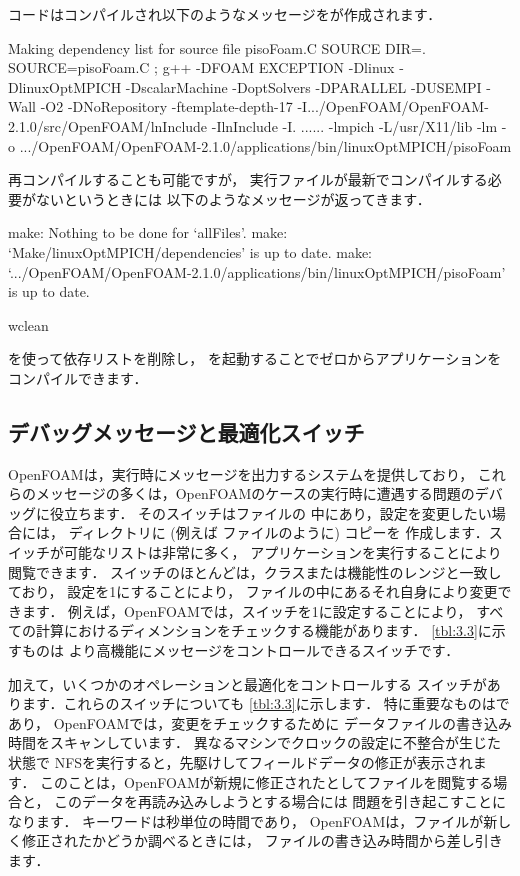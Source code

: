 コードはコンパイルされ以下のようなメッセージをが作成されます．
\begin{OFverbatim}[file]
Making dependency list for source file pisoFoam.C
SOURCE DIR=.
SOURCE=pisoFoam.C ;
g++ -DFOAM EXCEPTION -Dlinux -DlinuxOptMPICH
-DscalarMachine -DoptSolvers -DPARALLEL -DUSEMPI -Wall -O2 -DNoRepository
-ftemplate-depth-17 -I.../OpenFOAM/OpenFOAM-2.1.0/src/OpenFOAM/lnInclude
-IlnInclude
-I.
......
-lmpich -L/usr/X11/lib -lm
-o .../OpenFOAM/OpenFOAM-2.1.0/applications/bin/linuxOptMPICH/pisoFoam
\end{OFverbatim}
再コンパイルすることも可能ですが，
実行ファイルが最新でコンパイルする必要がないというときには
以下のようなメッセージが返ってきます．
\begin{OFverbatim}[file]
make: Nothing to be done for `allFiles'.
make: `Make/linuxOptMPICH/dependencies' is up to date.
make: `.../OpenFOAM/OpenFOAM-2.1.0/applications/bin/linuxOptMPICH/pisoFoam'
is up to date.
\end{OFverbatim}

\begin{OFverbatim}[terminal]
wclean
\end{OFverbatim}
を使って依存リストを削除し，
を起動することでゼロからアプリケーションをコンパイルできます．


\subsection{デバッグメッセージと最適化スイッチ}
\label{ssec:3.2.5}
OpenFOAMは，実行時にメッセージを出力するシステムを提供しており，
これらのメッセージの多くは，OpenFOAMのケースの実行時に遭遇する問題のデバッグに役立ちます．
そのスイッチはファイルの
中にあり，設定を変更したい場合には，
ディレクトリに (例えば
ファイルのように) コピーを
作成します．スイッチが可能なリストは非常に多く，
アプリケーションを実行することにより閲覧できます．
スイッチのほとんどは，クラスまたは機能性のレンジと一致しており，
設定を1にすることにより，
ファイルの中にあるそれ自身により変更できます．
例えば，OpenFOAMでは，スイッチを1に設定することにより，
すべての計算におけるディメンションをチェックする機能があります．
\autoref{tbl:3.3}に示すものは
より高機能にメッセージをコントロールできるスイッチです．

加えて，いくつかのオペレーションと最適化をコントロールする
スイッチがあります．これらのスイッチについても
\autoref{tbl:3.3}に示します．
特に重要なものはであり，
OpenFOAMでは，変更をチェックするために
データファイルの書き込み時間をスキャンしています．
異なるマシンでクロックの設定に不整合が生じた状態で
NFSを実行すると，先駆けしてフィールドデータの修正が表示されます．
このことは，OpenFOAMが新規に修正されたとしてファイルを閲覧する場合と，
このデータを再読み込みしようとする場合には
問題を引き起こすことになります．
キーワードは秒単位の時間であり，
OpenFOAMは，ファイルが新しく修正されたかどうか調べるときには，
ファイルの書き込み時間から差し引きます．


